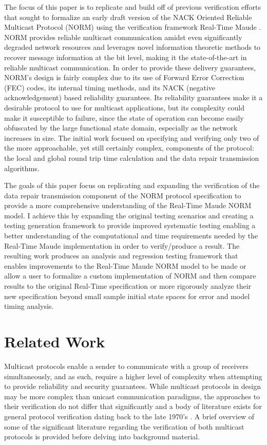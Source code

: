 \documentclass[10pt, journal]{IEEEtran}
\begin{document}
The focus of this paper is to replicate and build off of previous verification efforts that sought to formalize an early draft version of the NACK Oriented Reliable Multicast Protocol (NORM) using the verification framework Real-Time Maude \cite{Lien2004, rfc5740, rtmaudeUrl, maudeUrl}. NORM provides reliable multicast communication amidst even significantly degraded network resources and leverages novel information theoretic methods to recover message information at the bit level, making it the state-of-the-art in reliable multicast communication. In order to provide these delivery guarantees, NORM's design is fairly complex due to its use of Forward Error Correction (FEC) codes, its internal timing methods, and its NACK (negative acknowledgement) based reliability guarantees. Its reliability guarantees make it a desirable protocol to use for multicast applications, but its complexity could make it susceptible to failure, since the state of operation can become easily obfuscated by the large functional state domain, especially as the network increases in size. The initial work focused on specifying and verifying only two of the more approachable, yet still certainly complex, components of the protocol: the local and global round trip time calculation and the data repair transmission algorithms. 

The goals of this paper focus on replicating and expanding the verification of the data repair transmission component of the NORM protocol specification to provide a more comprehensive understanding of the Real-Time Maude NORM model. I achieve this by expanding the original testing scenarios and creating a testing generation framework to provide improved systematic testing enabling a better understanding of the computational and time requirements needed by the Real-Time Maude implementation in order to verify/produce a result. The resulting work produces an analysis and regression testing framework that enables improvements to the Real-Time Maude NORM model to be made or allow a user to formalize a custom implementation of NORM and then compare results to the original Real-Time specification or more rigorously analyze their new specification beyond small sample initial state spaces for error and model timing analysis. 

\section{Related Work}
Multicast protocols enable a sender to communicate with a group of receivers simultaneously, and as such, require a higher level of complexity when attempting to provide reliability and security guarantees. While multicast protocols in design may be more complex than unicast communication paradigms, the approaches to their verification do not differ that significantly and a body of literature exists for general protocol verification dating back to the late 1970's \cite{Bochman1980}. A brief overview of some of the significant literature regarding the verification of both multicast protocols is provided before delving into background material.
\end{document}
